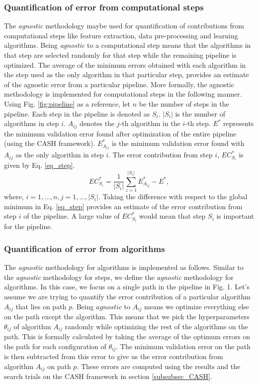 \subsubsection{Quantification of error from computational steps}
\label{subsubsec_eq_steps}
The \textit{agnostic} methodology maybe used for quantification of contributions from computational steps like feature extraction, data pre-processing and learning algorithms. Being \textit{agnostic} to a computational step means that the algorithms in that step are selected randomly for that step while the remaining pipeline is optimized. The average of the minimum errors obtained with each algorithm in the step used as the only algorithm in that particular step, provides an estimate of the agnostic error from a particular pipeline.  
More formally, the agnostic methodology is implemented for computational steps in the following manner. Using Fig. \ref{fig:pipeline} as a reference, let $n$ be the number of steps in the pipeline. Each step in the pipeline is denoted as $S_i$. $|S_i|$ is the number of algorithms in step $i$. $A_{ij}$ denotes the $j$-th algorithm in the $i$-th step. $E^*$ represents the minimum validation error found after optimization of the entire pipeline (using the CASH framework). $E_{A_{ij}}^*$ is the minimum  validation error found with $A_{ij}$ as the only algorithm in step $i$. The error contribution from step $i$, $EC_{S_i}^*$ is given by Eq. \ref{eq_step}.
\begin{equation}
\label{eq_step}
EC_{S_i}^* = \frac{1}{|S_i|}\sum_{z=1}^{|S_i|} E_{A_{ij}}^* - E^*,
\end{equation}
where, $i = {1, ..., n}, j = {1, ..., |S_i|}$.
Taking the difference with respect to the global minimum in Eq. \ref{eq_step} provides an estimate of the error contribution from step $i$ of the pipeline. A large value of $EC_{S_i}^*$ would mean that step $S_i$ is important for the pipeline.

\subsubsection{Quantification of error from algorithms}
\label{subsubsec_eq_alg}
The \textit{agnostic} methodology for algorithms is implemented as follows. Similar to the \textit{agnostic} methodology for steps, we define the \textit{agnostic} methodology for algorithms. In this case, we focus on a single path in the pipeline in Fig. 1. Let's assume we are trying to quantify the error contribution of a particular algorithm $A_{ij}$ that lies on path $p$. Being $agnostic$ to $A_{ij}$ means we optimize everything else on the path except the algorithm. This means that we pick the hyperparameters $\theta_{ij}$ of algorithm $A_{ij}$ randomly while optimizing the rest of the algorithms on the path. This is formally calculated by taking the average of the optimum errors on the path for each configuration of $\theta_{ij}$. The minimum validation error on the path is then subtracted from this error to give us the error contribution from algorithm $A_{ij}$ on path $p$. These errors are computed using the results and the search trials on the CASH framework in section \ref{subsubsec_CASH}.

